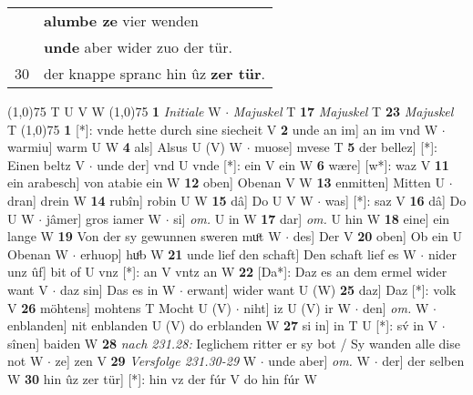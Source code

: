 \documentclass[8pt,a4paper,notitlepage]{article}
\begin{document}
\begin{table}[ht]
\begin{minipage}[t]{0.5\linewidth}
\begin{tabular}{rl}
 & \textbf{alumbe ze} vier wenden\\ 
 & \textbf{unde} aber wider zuo der tür.\\ 
30 & der knappe spranc hin ûz \textbf{zer tür}.\\ 
\end{tabular}
\scriptsize
\line(1,0){75} \newline
T U V W \newline
\line(1,0){75} \newline
\textbf{1} \textit{Initiale} W   $\cdot$ \textit{Majuskel} T  \textbf{17} \textit{Majuskel} T  \textbf{23} \textit{Majuskel} T  \newline
\line(1,0){75} \newline
\textbf{1} [*]: vnde hette durch sine siecheit V \textbf{2} unde an im] an im vnd W  $\cdot$ warmiu] warm U W \textbf{4} als] Alsus U (V) W  $\cdot$ muose] mvese T \textbf{5} der bellez] [*]: Einen beltz V  $\cdot$ unde der] vnd U vnde [*]: ein V ein W \textbf{6} wære] [w*]: waz V \textbf{11} ein arabesch] von atabie ein W \textbf{12} oben] Obenan V W \textbf{13} enmitten] Mitten U  $\cdot$ dran] drein W \textbf{14} rubîn] robin U W \textbf{15} dâ] Do U V W  $\cdot$ was] [*]: saz V \textbf{16} dâ] Do U W  $\cdot$ jâmer] gros iamer W  $\cdot$ si] \textit{om.} U in W \textbf{17} dar] \textit{om.} U hin W \textbf{18} eine] ein lange W \textbf{19} Von der sy gewunnen sweren muͦt W  $\cdot$ des] Der V \textbf{20} oben] Ob ein U Obenan W  $\cdot$ erhuop] huͦb W \textbf{21} unde lief den schaft] Den schaft lief es W  $\cdot$ nider unz ûf] bit of U vnz [*]: an V vntz an W \textbf{22} [Da*]: Daz es an dem ermel wider want V  $\cdot$ daz sin] Das es in W  $\cdot$ erwant] wider want U (W) \textbf{25} daz] Daz [*]: volk V \textbf{26} möhtens] mohtens T Mocht U (V)  $\cdot$ niht] iz U (V) ir W  $\cdot$ den] \textit{om.} W  $\cdot$ enblanden] nit enblanden U (V) do erblanden W \textbf{27} si in] in T U [*]: sv́ in V  $\cdot$ sînen] baiden W \textbf{28} \textit{nach 231.28:} Ieglichem ritter er sy bot / Sy wanden alle dise not W   $\cdot$ ze] zen V \textbf{29} \textit{Versfolge 231.30-29} W   $\cdot$ unde aber] \textit{om.} W  $\cdot$ der] der selben W \textbf{30} hin ûz zer tür] [*]: hin vz der fúr V do hin fúr W \newline
\end{minipage}
\end{table}
\end{document}
